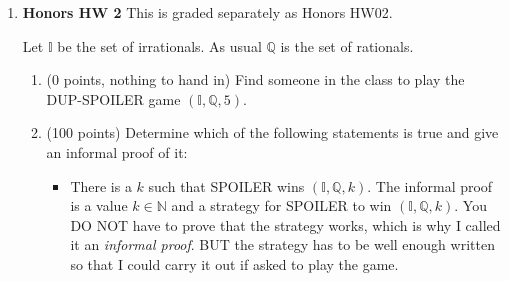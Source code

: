 \documentclass[12pt]{article}
\newcommand{\I}{\mathbb{I}}
\newcommand{\Z}{\mathbb{Z}}
\newcommand{\N}{\mathbb{N}}
\newcommand{\Q}{\mathbb{Q}}
\begin{document}
\begin{enumerate}
\begin{enumerate}
\item
(15 points)
A sentence which is true with domain $\Z$ but false with domain $\Q$. 
\begin{itemize}
    \item {}
\end{itemize}
\item 
(15 points)
($(0,1)$ is the set of all reals between 0 and 1 but not including 0 or 1.)
A sentence which is true with domain $(0,1)$ but false with domain $\Q$. 
(Warning: You can't use $(\exists x)[x^2=\frac{1}{2}]$ since this cannot be
stated just using $<$.) 
\begin{itemize}
    \item \textbf{No such sentence exists}
\end{itemize}
\end{enumerate}


\vfill

\centerline{\bf GO TO NEXT PAGE} 

\newpage
\item 
{\bf Honors HW 2} This is graded separately as Honors HW02.

Let $\I$ be the set of irrationals. As usual $\Q$ is the set of rationals.

\begin{enumerate}
\item 
(0 points, nothing to hand in)
Find someone in the class to play the DUP-SPOILER game $(\I,\Q,5)$.

\item
(100 points)
Determine which of the following statements is true and give an informal proof of it:

\begin{itemize}
\item 
There is a $k$ such that SPOILER wins $(\I,\Q,k)$.
The informal proof is a value $k\in\N$ and a strategy
for SPOILER to win $(\I,\Q,k)$. 
You DO NOT have to prove that
the strategy works, which is why I called it an {\it informal proof}.
BUT the strategy has to be well enough written so that I could carry
it out if asked to play the game.


\end{itemize}
\end{enumerate}
\end{enumerate}
\end{document}
